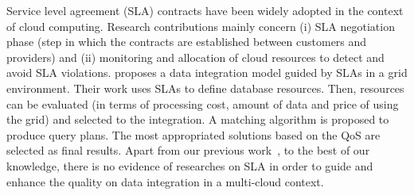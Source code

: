 %

Service level agreement (SLA) contracts have been widely adopted in the context of cloud computing. Research contributions mainly concern (i) SLA negotiation phase (step in which the contracts are established between customers and providers) and (ii) monitoring and allocation of cloud resources to detect and avoid SLA violations.
\cite{Nie07} proposes a data integration model guided by SLAs in a grid
environment. Their work uses SLAs to define database resources. Then, resources
can be evaluated (in terms of processing cost, amount of data and price of using the grid) and selected to the integration. A matching algorithm is proposed to produce query plans. The most appropriated solutions based on the QoS are selected as final results. 
Apart from our previous work~\cite{Bennani2014}, to the best of our knowledge, there is no evidence of researches on SLA in order to guide and enhance the quality on data integration in a multi-cloud context.

